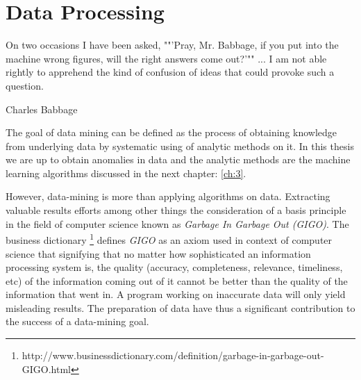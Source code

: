 \chapter{Data Processing}\label{ch:2}
\epigraph{On two occasions I have been asked, ""'Pray, Mr. Babbage, if you put into the machine wrong figures, will the right answers come out?'"" ... I am not able rightly to apprehend the kind of confusion of ideas that could provoke such a question.}{Charles Babbage}

The goal of data mining can be defined as the process of obtaining knowledge from underlying data by systematic using of analytic methods on it. In this thesis we are up to obtain anomalies in data and the analytic methods are the machine learning algorithms discussed in the next chapter: \ref{ch:3}. 

However, data-mining is more than applying algorithms on data. Extracting valuable results efforts among other things the consideration of a basis principle in the field of computer science known as \textit{Garbage In Garbage Out (GIGO)}. The business dictionary \footnote{http://www.businessdictionary.com/definition/garbage-in-garbage-out-GIGO.html}  defines \textit{GIGO} as an axiom used in context of computer science that signifying that no matter how sophisticated an information processing system is, the quality (accuracy, completeness, relevance, timeliness, etc) of the information coming out of it cannot be better than the quality of the information that went in. A program working on inaccurate data will only yield misleading results. The preparation of data have thus a significant contribution to the success of a data-mining goal.

